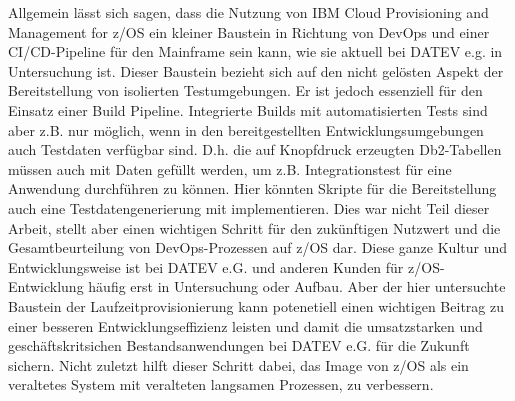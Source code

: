 Allgemein lässt sich sagen, dass die Nutzung von \glqq IBM Cloud Provisioning and Management for z/OS\grqq{} ein kleiner Baustein in 
Richtung von DevOps und einer CI/CD-Pipeline für den Mainframe sein kann, wie sie aktuell bei DATEV e.g. in Untersuchung ist.
Dieser  Baustein bezieht sich auf den nicht gelösten Aspekt der Bereitstellung von isolierten Testumgebungen.
Er ist jedoch essenziell für den Einsatz einer Build Pipeline.
Integrierte Builds mit automatisierten Tests sind aber z.B. nur möglich, wenn in den bereitgestellten Entwicklungsumgebungen auch Testdaten verfügbar sind.
D.h. die auf Knopfdruck erzeugten Db2-Tabellen müssen auch mit Daten gefüllt werden, um z.B. Integrationstest für eine Anwendung durchführen zu können.
Hier könnten Skripte für die Bereitstellung auch eine Testdatengenerierung mit implementieren. 
Dies war nicht Teil dieser Arbeit, stellt aber einen wichtigen Schritt für den zukünftigen Nutzwert und die Gesamtbeurteilung von DevOps-Prozessen auf z/OS dar.
Diese ganze Kultur und Entwicklungsweise ist bei DATEV e.G. und anderen Kunden für z/OS-Entwicklung häufig erst in Untersuchung oder Aufbau.
Aber der hier untersuchte Baustein der Laufzeitprovisionierung kann potenetiell einen wichtigen Beitrag zu einer besseren Entwicklungseffizienz leisten und damit die umsatzstarken und geschäftskritsichen Bestandsanwendungen bei DATEV e.G. für die Zukunft sichern.
Nicht zuletzt hilft dieser Schritt dabei, das Image von z/OS als ein veraltetes System mit veralteten langsamen Prozessen, zu verbessern.

